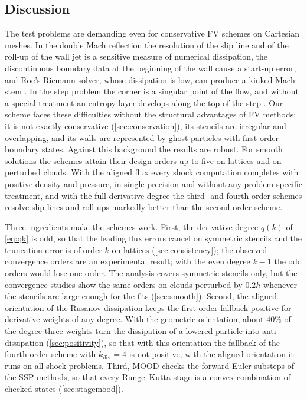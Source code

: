 \documentclass[11pt,a4paper]{article}
\numberwithin{equation}{section}
\newcommand{\qdiv}{q}
\begin{document}
\subsection{Discussion}\label{sec:discussion}

The test problems are demanding even for conservative FV schemes on Cartesian meshes. In the double Mach reflection the resolution of the slip line and of the roll-up of the wall jet is a sensitive measure of numerical dissipation, the discontinuous boundary data at the beginning of the wall cause a start-up error, and Roe's Riemann solver, whose dissipation is low, can produce a kinked Mach stem \cite{Quirk1994}. In the step problem the corner is a singular point of the flow, and without a special treatment an entropy layer develops along the top of the step \cite{Woodward1984}. Our scheme faces these difficulties without the structural advantages of FV methods: it is not exactly conservative (\cref{sec:conservation}), its stencils are irregular and overlapping, and its walls are represented by ghost particles with first-order boundary states. Against this background the results are robust. For smooth solutions the schemes attain their design orders up to five on lattices and on perturbed clouds. With the aligned flux every shock computation completes with positive density and pressure, in single precision and without any problem-specific treatment, and with the full derivative degree the third- and fourth-order schemes resolve slip lines and roll-ups markedly better than the second-order scheme.

Three ingredients make the schemes work. First, the derivative degree $\qdiv(k)$ of \eqref{eq:qk} is odd, so that the leading flux errors cancel on symmetric stencils and the truncation error is of order $k$ on lattices (\cref{sec:consistency}); the observed convergence orders are an experimental result; with the even degree $k-1$ the odd orders would lose one order. The analysis covers symmetric stencils only, but the convergence studies show the same orders on clouds perturbed by $0.2h$ whenever the stencils are large enough for the fits (\cref{sec:smooth}). Second, the aligned orientation of the Rusanov dissipation keeps the first-order fallback positive for derivative weights of any degree. With the geometric orientation, about $40\%$ of the degree-three weights turn the dissipation of a lowered particle into anti-dissipation (\cref{sec:positivity}), so that with this orientation the fallback of the fourth-order scheme with $k_{\mathrm{div}}=4$ is not positive; with the aligned orientation it runs on all shock problems. Third, MOOD checks the forward Euler substeps of the SSP methods, so that every Runge--Kutta stage is a convex combination of checked states (\cref{sec:stagemood}).
\end{document}
